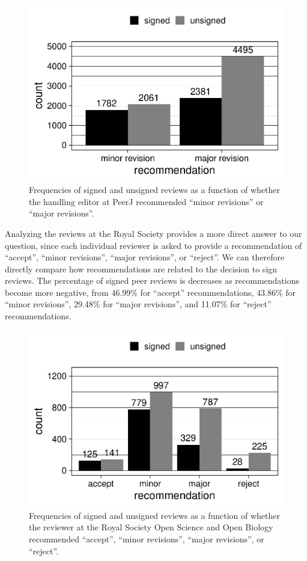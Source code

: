 \documentclass[,jou, a4paper,floatsintext]{apa6}
\begin{document}
\begin{figure}
\centering
\includegraphics{open_peer_review_files/figure-latex/PeerJrec-1.pdf}
\caption{\label{fig:PeerJrec}Frequencies of signed and unsigned reviews as a function of whether the handling editor at PeerJ recommended \enquote{minor revisions} or \enquote{major revisions}.}
\end{figure}

Analyzing the reviews at the Royal Society provides a more direct answer to our question, since each individual reviewer is asked to provide a recommendation of \enquote{accept}, \enquote{minor revisions}, \enquote{major revisions}, or \enquote{reject}. We can therefore directly compare how recommendations are related to the decision to sign reviews. The percentage of signed peer reviews is decreases as recommendations become more negative, from 46.99\% for \enquote{accept} recommendations, 43.86\% for \enquote{minor revisions}, 29.48\% for \enquote{major revisions}, and 11.07\% for \enquote{reject} recommendations.

\begin{figure}
\centering
\includegraphics{open_peer_review_files/figure-latex/TRSrec-1.pdf}
\caption{\label{fig:TRSrec}Frequencies of signed and unsigned reviews as a function of whether the reviewer at the Royal Society Open Science and Open Biology recommended \enquote{accept}, \enquote{minor revisions}, \enquote{major revisions}, or \enquote{reject}.}
\end{figure}
\end{document}
